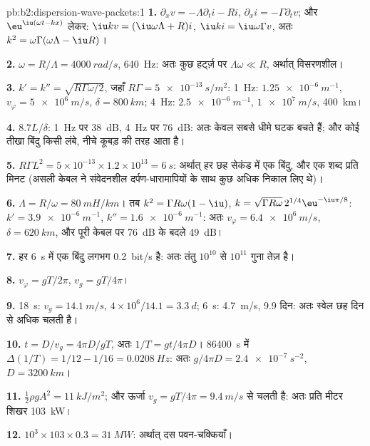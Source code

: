 \begin{solution}{pb:b2:dispersion-wave-packets:1}
\textbf{1.} $\partial_xv = -\Lambda\partial_ti - Ri$, $\partial_xi = -\Gamma\partial_tv$; और
$\eu^{\iu(\omega t - kx)}$ लेकर: $\iu kv = (\iu\omega\Lambda + R)i$, $\iu ki = \iu\omega\Gamma v$, अतः
$k^2 = \omega\Gamma(\omega\Lambda - \iu R)$।

\textbf{2.} $\omega = R/\Lambda = \qty{4000}{rad/s}$, \qty{640}{Hz}: अतः कुछ हर्ट्ज़ पर $\Lambda\omega
\ll R$, अर्थात् विसरणशील।

\textbf{3.} $k' = k'' = \sqrt{R\Gamma\omega/2}$, जहाँ $R\Gamma = \qty{5e-13}{s/m^2}$: \qty{1}{Hz}:
$\qty{1.25e-6}{m^{-1}}$, $v_\varphi = \qty{5e6}{m/s}$, $\delta = \qty{800}{km}$; \qty{4}{Hz}:
$\qty{2.5e-6}{m^{-1}}$, $\qty{1e7}{m/s}$, \qty{400}{km}।

\textbf{4.} $8.7L/\delta$: \qty{1}{Hz} पर \qty{38}{dB}, \qty{4}{Hz} पर \qty{76}{dB}: अतः केवल
सबसे धीमे घटक बचते हैं; और कोई तीखा बिंदु किसी लंबे, नीचे कूबड़ की तरह आता है।

\textbf{5.} $R\Gamma L^2 = 5 \times 10^{-13} \times 1.2 \times 10^{13} = \qty{6}{s}$: अर्थात् हर छह
सेकंड में एक बिंदु, और एक शब्द प्रति मिनट (असली केबल ने संवेदनशील दर्पण-धारामापियों
के साथ कुछ अधिक निकाल लिए थे)।

\textbf{6.} $\Lambda = R/\omega = \qty{80}{mH/km}$। तब $k^2 = \Gamma R\omega(1 - \iu)$, $k = \sqrt{\Gamma R\omega}
\,2^{1/4}\eu^{-\iu\pi/8}$: $k' = \qty{3.9e-6}{m^{-1}}$, $k'' = \qty{1.6e-6}{m^{-1}}$: अतः $v_\varphi =
\qty{6.4e6}{m/s}$, $\delta = \qty{620}{km}$, और पूरी केबल पर \qty{76}{dB} के बदले
\qty{49}{dB}।

\textbf{7.} हर \qty{6}{s} में एक बिंदु लगभग \qty{0.2}{bit/s} है: अतः तंतु
$10^{10}$ से $10^{11}$ गुना तेज़ है।

\textbf{8.} $v_\varphi = gT/2\pi$, $v_g = gT/4\pi$।

\textbf{9.} \qty{18}{s}: $v_g = \qty{14.1}{m/s}$, $4 \times 10^6/14.1 = \qty{3.3}{d}$;
\qty{6}{s}: \qty{4.7}{m/s}, \num{9.9} दिन: अतः स्वेल छह दिन से अधिक चलती है।

\textbf{10.} $t = D/v_g = 4\pi D/gT$, अतः $1/T = gt/4\pi D$। \qty{86400}{s} में $\Delta(1/T) = 1/12 - 1/16
= \qty{0.0208}{Hz}$: अतः $g/4\pi D = \qty{2.4e-7}{s^{-2}}$, $D = \qty{3200}{km}$।

\textbf{11.} $\tfrac12\rho gA^2 = \qty{11}{kJ/m^2}$; और ऊर्जा $v_g = gT/4\pi =
\qty{9.4}{m/s}$ से चलती है: अतः प्रति मीटर शिखर \qty{103}{kW}।

\textbf{12.} $10^3 \times 103 \times 0.3 = \qty{31}{MW}$: अर्थात् दस पवन-चक्कियाँ।


\end{solution}
